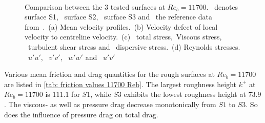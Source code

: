\begin{figure}
    \centering
    \begin{subfigure}[t]{0.495\textwidth}
        \centering
        \subcaption{}
        
        \label{subfig: Reb 11700 velocity profile}
    \end{subfigure}
    \hfill
    \begin{subfigure}[t]{0.495\textwidth}
        \centering
        \subcaption{}
        
        \label{subfig: Reb 11700 velocity defect}        
    \end{subfigure}
    \plotverticalspacing
    \begin{subfigure}[t]{0.495\textwidth}
        \centering
        \subcaption{}
        
        \label{subfig: Reb 11700 total stresses}
    \end{subfigure}
    \hfill
    \begin{subfigure}[t]{0.495\textwidth}
        \centering
        \subcaption{}
        
        \label{subfig: Reb 11700 reynolds stresses}
    \end{subfigure}
    \\[-10pt]
    \caption[Comparison of $S1$, $S2$ and $S3$ at $Re_b = 11700$]{Comparison between the 3 tested surfaces at $Re_b = 11700$. \sOneElevenSevenSymbol \ denotes surface S1, \sTwoElevenSevenSymbol \ surface S2, \sThreeElevenSevenSymbol \ surface S3 and  \ the reference data from~\cite{elkhouryDirectNumericalSimulation2013}.~(a) Mean velocity profiles.~(b) Velocity defect of local velocity to centreline velocity.~(c) \lsTotalStressSymbol \ total stress,\lsViscousStressSymbol \ Viscous stress, \lsReynoldsStressSymbol \ turbulent shear stress and \lsDispersiveStressSymbol \ dispersive stress.~(d) Reynolds stresses. \lsRuuSymbol \ $u'u'$, \lsRvvSymbol \ $v'v'$, \lsRwwSymbol \ $w'w'$ and \lsRuvSymbol \ $u'v'$}
    \label{fig: comp Reb 11700}
\end{figure}
Various mean friction and drag quantities for the rough surfaces at $Re_b = 11700$ are listed in 
\autoref{tab: friction values 11700 Reb}.
The largest roughness height $k^+$ at $Re_b = 11700$ is $111.1$ for $S1$, while $S3$ exhibits the lowest roughness height at $73.9$.
The viscous- as well as pressure drag decrease monotonically from $S1$ to $S3$.
So does the influence of pressure drag on total drag.
